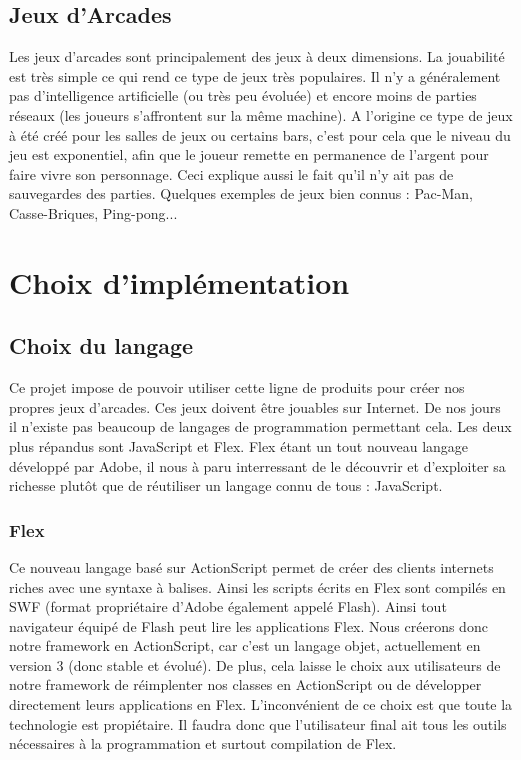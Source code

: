 \documentclass{article}
\begin{document}
	\subsection{Jeux d'Arcades}
		Les jeux d'arcades sont principalement des jeux à deux dimensions. La jouabilité est très simple ce qui rend ce type de jeux très populaires. Il n'y a généralement pas d'intelligence artificielle (ou très peu évoluée) et encore moins de parties réseaux (les joueurs s'affrontent sur la même machine).
		\ident A l'origine ce type de jeux à été créé pour les salles de jeux ou certains bars, c'est pour cela que le niveau du jeu est exponentiel, afin que le joueur remette en permanence de l'argent pour faire vivre son personnage. Ceci explique aussi le fait qu'il n'y ait pas de sauvegardes des parties.
		\ident Quelques exemples de jeux bien connus : Pac-Man, Casse-Briques, Ping-pong...

\newpage

\section{Choix d'implémentation}
	\subsection{Choix du langage}
		Ce projet impose de pouvoir utiliser cette ligne de produits pour créer nos propres jeux d'arcades. Ces jeux doivent être jouables sur Internet. De nos jours il n'existe pas beaucoup de langages de programmation permettant cela. Les deux plus répandus sont JavaScript et Flex. Flex étant un tout nouveau langage développé par Adobe, il nous à paru interressant de le découvrir et d'exploiter sa richesse plutôt que de réutiliser un langage connu de tous : JavaScript.
		\subsubsection{Flex}
			Ce nouveau langage basé sur ActionScript permet de créer des clients internets riches avec une syntaxe à balises. Ainsi les scripts écrits en Flex sont compilés en SWF (format propriétaire d'Adobe également appelé Flash). Ainsi tout navigateur équipé de Flash peut lire les applications Flex.
			\ident Nous créerons donc notre framework en ActionScript, car c'est un langage objet, actuellement en version 3 (donc stable et évolué). De plus, cela laisse le choix aux utilisateurs de notre framework de réimplenter nos classes en ActionScript ou de développer directement leurs applications en Flex.
			\ident L'inconvénient de ce choix est que toute la technologie est propiétaire. Il faudra donc que l'utilisateur final ait tous les outils nécessaires à la programmation et surtout compilation de Flex.
\end{document}
